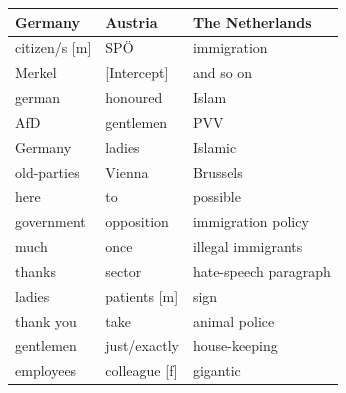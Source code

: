 \documentclass{article}
\begin{document}
\begin{table}[ht!]
\centering
\begin{tabular}{|l|l|l|}
\hline
\textbf{Germany}                         & \textbf{Austria}            & \textbf{The Netherlands} \\ \hline
\rowcolor[HTML]{F8766D} 
citizen/s {[}m{]}                        & SPÖ                         & immigration              \\ \hline
\rowcolor[HTML]{F8766D} 
Merkel                                   & [Intercept]                 & and so on                \\ \hline
\rowcolor[HTML]{F8766D} 
german                                   & honoured                    & Islam                    \\ \hline
\rowcolor[HTML]{F8766D} 
AfD                                      & gentlemen                   & PVV                      \\ \hline
\rowcolor[HTML]{F8766D} 
Germany                                  & ladies                      & Islamic                  \\ \hline
\rowcolor[HTML]{F8766D} 
old-parties                              & Vienna                      & Brussels                 \\ \hline
\rowcolor[HTML]{F8766D} 
here                                     & to                          & possible                 \\ \hline
\rowcolor[HTML]{F8766D} 
government                               & opposition                  & immigration policy       \\ \hline
\rowcolor[HTML]{F8766D} 
much                                     & once                        & illegal immigrants       \\ \hline
\rowcolor[HTML]{F8766D} 
thanks                                   & sector                      & hate-speech paragraph    \\ \hline
\rowcolor[HTML]{F8766D} 
ladies                                   & patients {[}m{]}            & sign                     \\ \hline
\rowcolor[HTML]{F8766D} 
thank you                                & take                        & animal police            \\ \hline
\rowcolor[HTML]{F8766D} 
gentlemen                                & just/exactly                & house-keeping            \\ \hline
\rowcolor[HTML]{F8766D} 
employees                                & colleague  {[}f{]}                 & gigantic                 \\ \hline

\end{tabular}
\end{table}
\end{document}
